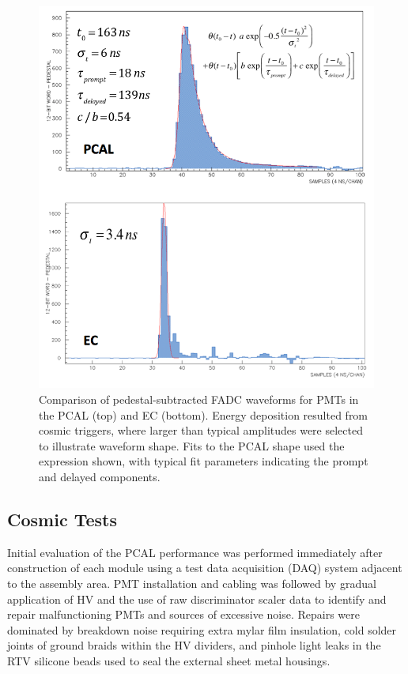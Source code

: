 \begin{figure}[hbt]
\centering
\includegraphics[width=0.95\columnwidth,keepaspectratio]{img/S5_3.png}
\caption{Comparison of pedestal-subtracted FADC waveforms for PMTs in the PCAL (top) and EC (bottom). Energy
  deposition resulted from cosmic triggers, where larger than typical amplitudes were selected to illustrate
  waveform shape. Fits to the PCAL shape used the expression shown, with typical fit parameters indicating the
  prompt and delayed components.}
\label{fig:S5_3}
\end{figure}

\subsection{Cosmic Tests}

\label{CRT}

Initial evaluation of the PCAL performance was performed immediately after construction of each module using a
test data acquisition (DAQ) system adjacent to the assembly area. PMT installation and cabling was followed by
gradual application of HV and the use of raw discriminator scaler data to identify and repair malfunctioning PMTs
and sources of excessive noise. Repairs were dominated by breakdown noise requiring extra mylar film insulation,
cold solder joints of ground braids within the HV dividers, and pinhole light leaks in the RTV silicone beads used to
seal the external sheet metal housings. 

